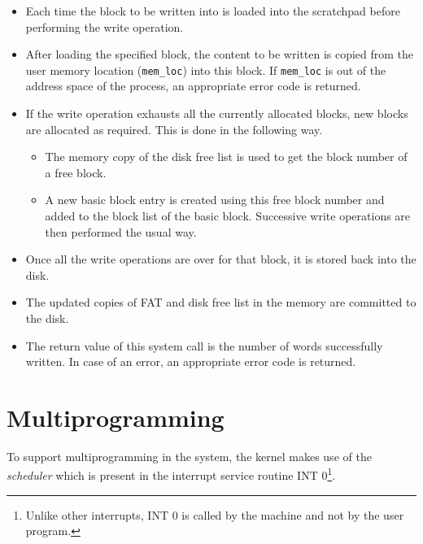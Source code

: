 \documentclass[10pt]{report}
\begin{document}
\begin{itemize}
	\item Each time the block to be written into is loaded into the scratchpad before performing the write operation.
	
	\item After loading the specified block, the content to be written is copied from the user memory location (\texttt{mem\_loc}) into this block. If \texttt{mem\_loc} is out of the address space of the process, an appropriate error code is returned.
	
	\item If the write operation exhausts all the currently allocated blocks, new blocks are allocated as required. This is done in the following way.
	\begin{itemize}
		\item The memory copy of the disk free list  is used to get the block number of a free block.
		\item A new basic block entry is created using this free block number and added to the block list of the basic block. Successive write operations are then performed the usual way.
	\end{itemize}
	
	\item Once all the write operations are over for that block, it is stored back into the disk.
	
	\item The updated copies of FAT  and disk free list 
	 in the memory are committed to the disk.
	
	\item The return value of this system call is the number of words successfully written. In case of an error, an appropriate error code is returned.
\end{itemize}

\chapter{Multiprogramming}
\label{chp:multiprog}
To support multiprogramming in the system, the kernel makes use of the \emph{scheduler} which is present in the interrupt service routine INT 0\footnote{Unlike other interrupts, INT 0 is called by the machine and not by the user program.}.
\end{document}
